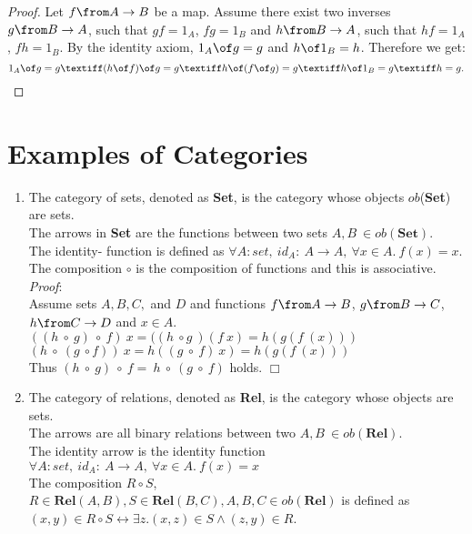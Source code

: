 \begin{proof}
  Let $f \from A \to B$ be a map.
  Assume there exist two inverses $g \from B \to A$, such that $gf = 1_A$, $fg = 1_B$ and \mbox{$h \from B \to A$}, such that $hf = 1_A$, $fh = 1_B$.
  By the identity axiom, $1_A \of g = g$ and $h \of 1_B = h$. Therefore we get:
 \[  1_A \of g = g \textiff (h \of f) \of g = g \textiff h \of (f \of g) = g \textiff h \of 1_B = g \textiff h=g. \]
\end{proof}


\section {Examples of Categories}
\begin {enumerate}

 \item The category of sets, denoted as \textbf{Set}, is the category whose objects $ob$(\textbf{Set}) are sets.
   \\ The arrows in \textbf{Set} are the functions between two sets $A,B\ \in ob(\textbf{Set}).$
   \\ The identity- function is defined as $\forall A: set, \ id_A:\ A \to A,\ \forall x \in A. \ f (x) = x$.
   \\ The composition $\circ$ is the composition of functions and this is associative. \\\textit{Proof}:
   \\ Assume sets $A, B, C,$ and $D$ and functions $f \from A \to B$, $g \from B \to C$, $h \from C \to D$ and $x \in A$.
   \\ $((h\ \circ \ g)\ \circ\ f)\ x = ((h \ \circ g \ )(f \ x) =h(g(f\  (x))) $
   \\ $(h\ \circ \ (g \ \circ f))\ x = h ((g\ \circ \ f) \ x) = h(g(f \ (x)))$
   \\ Thus $(h\ \circ \ g)\ \circ \ f = \ h \ \circ \ (g \ \circ \ f)$ holds. $\Box$
 \item The category of relations, denoted as \textbf{Rel}, is the category whose objects are sets.
   \\The arrows are all binary relations between two $A,B \ \in ob(\textbf{Rel}).$
   \\The identity arrow  is the identity function $\forall A: set, \ id_A:\ A \to A,\ \forall x \in A. \ f (x) = x$
   \\ The composition $R \circ S$, $R  \in \textbf{Rel}(A,B), S \in \textbf{Rel}(B,C), A,B,C \in ob(\textbf{Rel})$ is defined as $ (x,y) \in  R \circ S \leftrightarrow \exists  z.(x,z) \in S \land (z,y) \in R$.
   

\end{enumerate}

